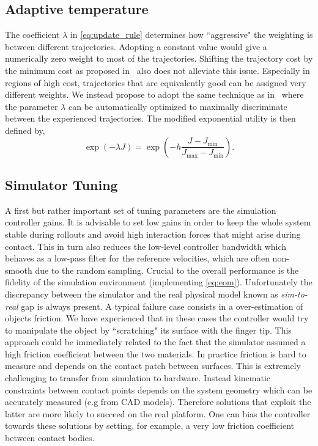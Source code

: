 \subsection{Adaptive temperature} 
The coefficient $\lambda$ in \eqref{eq:update_rule} determines how ``aggressive" the weighting is between different trajectories. Adopting a constant value would give a numerically zero weight to most of the trajectories. Shifting the trajectory cost by the minimum cost as proposed in~\cite{williams_information_2017} also does not alleviate this issue. 
Especially in regions of high cost, trajectories that are equivalently good can be assigned very different weights. We instead propose to adopt the same technique as in~\cite{theodorou2010generalized} where the parameter $\lambda$ can be automatically optimized to maximally discriminate between the experienced trajectories. The modified exponential utility is then defined by,
\begin{equation} \label{eq:adaptive_t}
    \exp (-\lambda J ) = \exp \left( -h \frac{J - J_{\min}}{J_{\max} - J_{\min}} \right).
\end{equation}

\subsection{Simulator Tuning}
A first but rather important set of tuning parameters are the simulation controller gains. 
It is advisable to set  low gains in order to keep the whole system stable during rollouts and avoid high interaction forces that might arise during contact. This in turn also reduces the low-level controller bandwidth which behaves as a low-pass filter for the reference velocities, which are often non-smooth due to the random sampling. Crucial to the overall performance is the fidelity of the simulation environment (implementing \eqn \ref{eq:eom}). Unfortunately the discrepancy between the simulator and the real physical model known as \emph{sim-to-real} gap is always present. A typical failure case consists in a over-estimation of objects friction. We have experienced that in these cases the controller would try to manipulate the object by ``scratching" its surface with the finger tip. This approach could be immediately related to the fact that the simulator assumed a high friction coefficient between the two materials. In practice friction is hard to measure and depends on the contact patch between surfaces. This is extremely challenging to transfer from simulation to hardware. Instead kinematic constraints between contact points depends on the system geometry which can be accurately measured (e.g from CAD models). Therefore solutions that exploit the latter are more likely to succeed on the real platform. One can bias the controller towards these solutions by setting, for example, a very low friction coefficient between contact bodies.


